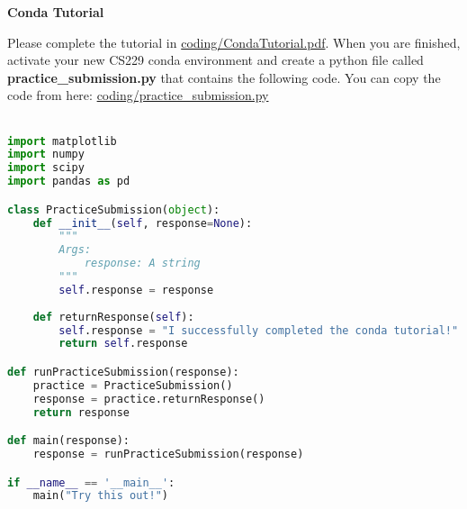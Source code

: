 \item {} {\bf Conda Tutorial}

Please complete the tutorial in \url{coding/CondaTutorial.pdf}. When you are finished, activate your new CS229 conda environment and create a python file called \textbf{practice\_submission.py} that contains the following code. You can copy the code from here: \url{coding/practice\_submission.py}\\
\\

\begin{lstlisting}[language=Python, numbers=none, caption=\textbf{practice\_submission.py}]
import matplotlib
import numpy
import scipy
import pandas as pd

class PracticeSubmission(object): 
    def __init__(self, response=None):
        """
        Args:
            response: A string
        """
        self.response = response
    
    def returnResponse(self):
        self.response = "I successfully completed the conda tutorial!"
        return self.response

def runPracticeSubmission(response):
    practice = PracticeSubmission()
    response = practice.returnResponse()
    return response

def main(response):
    response = runPracticeSubmission(response)

if __name__ == '__main__':
    main("Try this out!")
\end{lstlisting}